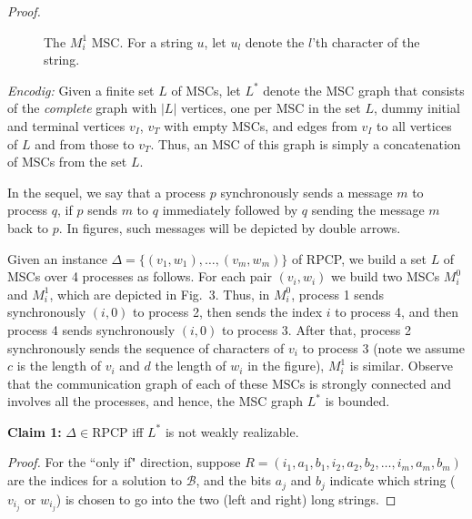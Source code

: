 \begin{proof}
\begin{figure}[h]
\centering
\begin{msc}[draw frame=none, draw head=none, msc keyword=, head height=0px, label distance=0.5ex, foot height=0px, foot distance=0px]{}

\end{msc}
\caption{The $M_i^1$ MSC. For a string $u$, let $u_l$ denote the $l$’th character of the string.}
\end{figure}


\textit{Encodig:} Given a finite set $L$ of
MSCs, let $L^*$ denote the MSC graph that consists of the \textit{complete}
graph with $|L|$ vertices, one per MSC in the set $L$, dummy initial
and terminal vertices $v_I$, $v_T$ with empty MSCs, and edges from
$v_I$ to all vertices of $L$ and from those to $v_T$. Thus, an MSC of
this graph is simply a concatenation of MSCs from the set $L$.

In the sequel, we say that a process $p$ synchronously sends a
message $m$ to process $q$, if $p$ sends $m$ to $q$ immediately
followed by $q$ sending the message $m$ back to $p$. In figures,
such messages will be depicted by double arrows.

Given an instance $\Delta = \{(v_1, w_1), \ldots, (v_m, w_m)\}$ of
RPCP, we build a set $L$ of MSCs over 4 processes as follows.
For each pair $(v_i, w_i)$ we build two MSCs $M^0_i$ and $M^1_i$,
which are depicted in Fig.~3.
Thus, in $M^0_i$, process 1 sends synchronously $(i, 0)$ to process 2,
then sends the index $i$ to process 4, and then process 4 sends
synchronously $(i, 0)$ to process 3. After that, process 2
synchronously sends the sequence of characters of $v_i$ to process 3 (note we assume $c$
is the length of $v_i$ and $d$ the length of $w_i$ in the figure), $M^1_i$
is similar. Observe that the communication graph of each of these
MSCs is strongly connected and involves all the processes, and
hence, the MSC graph $L^*$ is bounded.

\textbf{Claim 1:} $\Delta \in \text{RPCP}$ iff $L^*$ is not weakly realizable.

\textit{Proof.} For the ``only if" direction, suppose $R = (i_1, a_1, b_1, i_2, a_2, b_2, \ldots,
i_m, a_m, b_m)$ are the indices for a solution to $\mathcal{B}$, and the bits $a_j$ and $b_j$
indicate which string ($v_{i_j}$ or $w_{i_j}$) is chosen to go into the two (left and right)
long strings.


\end{proof}
